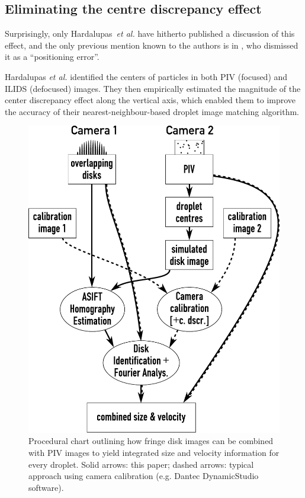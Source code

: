 \documentclass[11.5pt,oneside]{book}
\begin{document}
\subsection{Eliminating the centre discrepancy effect}
Surprisingly, only Hardalupas~\emph{et al.} \cite{Hardalupas10, Hardalupas10a}
have hitherto published a discussion of this effect, and the only previous
mention known to the authors is in \citet{Kurosawa02}, who dismissed it as a
``positioning error''.

Hardalupas \emph{et al.} identified the centers of particles in both PIV
(focused) and ILIDS (defocused) images. They then empirically estimated the
magnitude of the center discrepancy effect along the vertical axis, which
enabled them to improve the accuracy of their nearest-neighbour-based droplet
image matching algorithm.

\begin{figure}
    \centering
    \includegraphics[height=0.75\textheight]{img/overlapping_flowchart.pdf}
    \caption{Procedural chart outlining how fringe disk images can be combined with
    PIV images to yield integrated size and velocity information for every
    droplet. Solid arrows: this paper; dashed arrows: typical approach using
  camera calibration (e.g. Dantec DynamicStudio software).}
\label{fig:overlapping-flowchart}
\end{figure}
\end{document}
